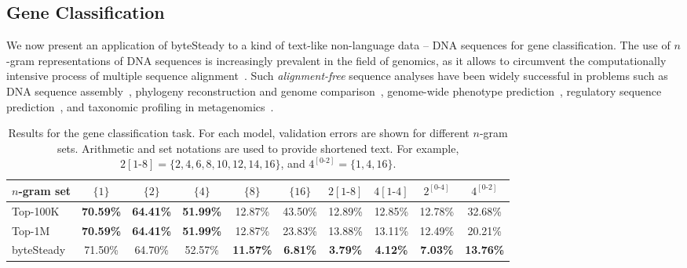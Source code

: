 \documentclass[sigconf,review, anonymous]{acmart}
\begin{document}
\subsection{Gene Classification}

We now present an application of byteSteady to a kind of text-like non-language data -- DNA sequences for gene classification.
The use of $n$-gram representations of DNA sequences is increasingly prevalent in the field of genomics, as it allows to circumvent the computationally intensive process of multiple sequence alignment~\cite{bonham2014alignment}.
Such \textit{alignment-free} sequence analyses have been widely successful in problems such as DNA sequence assembly~\cite{boisvert2010ray, compeau2011apply}, phylogeny reconstruction and genome comparison~\cite{deraspe2017phenetic,leimeister2014kmacs,wen2014k}, genome-wide phenotype prediction~\cite{drouin2019interpretable,nguyen2018developing,davis2016antimicrobial,drouin2016predictive}, regulatory sequence prediction~\cite{ghandi2014enhanced,arvey2012sequence,sharmin2016heterogeneity}, and taxonomic profiling in metagenomics~\cite{raymond2016partial,vervier2016large,boisvert2012raymeta}.

\begin{table}[t]
    \centering
    \caption{Results for the gene classification task. For each model, validation errors are shown for different \(n\)-gram sets. Arithmetic and set notations are used to provide shortened text. For example, \(2[1\text{-}8] = \{2,4,6,8,10,12,14,16\}\), and \(4^{[0\text{-}2]}=\{1,4,16\}\).}
    \begin{tabular}{lccccccccc}
        \toprule
        \(n\)-gram set & \(\{1\}\) & \(\{2\}\) & \(\{4\}\) & \(\{8\}\) & \(\{16\}\) & \(2 [1\text{-}8]\) & \(4 [1\text{-}4]\) & \(2^{[0\text{-}4]}\) & \(4^{[0\text{-}2]}\)\\
        \midrule
        Top-100K & \textbf{70.59\%} & \textbf{64.41\%} & \textbf{51.99\%} & 12.87\% & 43.50\% & 12.89\% & 12.85\% & 12.78\% & 32.68\% \\
        Top-1M & \textbf{70.59\%} & \textbf{64.41\%} & \textbf{51.99\%} & 12.87\% & 23.83\% & 13.88\% & 13.11\% & 12.49\% & 20.21\% \\
        byteSteady & 71.50\% & 64.70\% & 52.57\% & \textbf{11.57\%} & \textbf{6.81\%} & \textbf{3.79\%} & \textbf{4.12\%} & \textbf{7.03\%} & \textbf{13.76\%} \\
        \bottomrule
    \end{tabular}
    \label{tab:gene_results}
\end{table}
\end{document}
